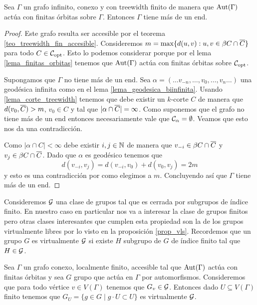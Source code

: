 \documentclass[tesis.tex]{subfiles}
\begin{document}
\begin{lema}\label{lema_tw_mas_1_end}
	Sea $\Gamma$ un grafo infinito, conexo y con treewidth finito de manera que $\text{Aut}(\Gamma)$ actúa con finitas órbitas sobre $\Gamma$.
	Entonces $\Gamma$ tiene más de un end.
\end{lema}
\begin{proof}
	Este grafo resulta ser accesible por el teorema \ref{teo_treewidth_fin_accesible}.
	Consideremos $m = \max \{  d(u,v) : u,v \in \beta C \cap \overline C \}$ para todo $C \in {\cal C}_{\text{opt}}$.
	Esto lo podemos considerar porque por el lema \ref{lema_finitas_orbitas} tenemos que $\text{Aut}(\Gamma)$ actúa con finitas órbitas sobre ${\cal C}_{\text{opt}}$.
	
	Supongamos que $\Gamma$ no tiene más de un end.
	Sea $\alpha = (\dots v_{-n}, \dots, v_{0}, \dots, v_{n} \dots)$ una geodésica infinita como en el lema \ref{lema_geodesica_biinfinita}.
	Usando \ref{lema_corte_treewidth} tenemos que debe existir un $k$-corte $C$ de manera que $d(v_{0}, \overline C) > m$, $v_{0} \in C$ y tal que $|\alpha \cap \overline C|=\infty$.
	Como suponemos que el grafo no tiene más de un end entonces necesariamente vale que ${\cal{C}}_{\alpha} = \emptyset$. 
	Veamos que esto nos da una contradicción.
	
	Como $|\alpha \cap C| < \infty$ debe existir $i,j \in \mathbb{N}$ de manera que $v_{-i} \in \beta C \cap \overline C$ y $v_{j} \in \beta C \cap \overline C$.
	Dado que $\alpha$ es geodésico tenemos que
	\[
		d(v_{-i},v_{j}) = d(v_{-i},v_{0}) + d(v_{0}, v_{j}) = 2m
	\]
	y esto es una contradicción por como elegimos a $m$. 
	Concluyendo así que $\Gamma$ tiene más de un end.
	
\end{proof}

Consideremos ${\cal G}$ una clase de grupos tal que es cerrada por subgrupos de índice finito.
En nuestro caso en particular nos va a interesar la clase de grupos finitos pero otras clases interesantes que cumplen esta propiedad son la de los grupos virtualmente libres por lo visto en la proposición \ref{prop_vls}.
Recordemos que un grupo $G$ es virtualmente ${\cal G}$ si existe $H$ subgrupo de $G$ de índice finito tal que $H \in {\cal G}$.

\begin{lema}\label{lema_accion_virtualmente_g}
	Sea $\Gamma$ un grafo conexo, localmente finito, accesible tal que $\text{Aut}(\Gamma)$ actúa con finitas órbitas y sea $G$ grupo que actúa en $\Gamma$ por automorfismos.
	Consideremos que para todo vértice $v \in V(\Gamma)$ tenemos que $G_{v} \in {\cal G}$.
	Entonces dado $U \subseteq V(\Gamma)$ finito tenemos que $G_{U} = \{ g \in G \mid g \cdot { U} \subset { U} \}$ es virtualmente ${\cal G}$.
\end{lema}
\end{document}
